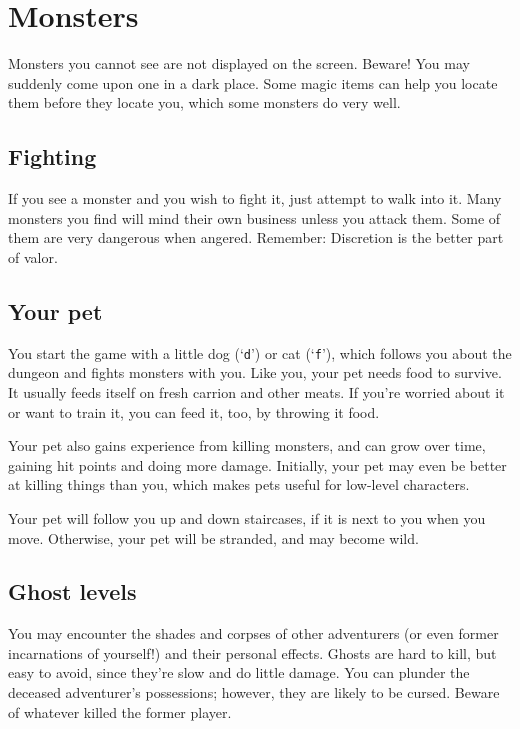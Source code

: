 \section{Monsters}

Monsters you cannot see are not displayed on the screen.  Beware!
You may suddenly come upon one in a dark place.  Some magic items can
help you locate them before they locate you, which some monsters do
very well.

\subsection*{Fighting}

If you see a monster and you wish to fight it, just attempt to walk
into it.  Many monsters you find will mind their own business unless
you attack them.  Some of them are very dangerous when angered.
Remember:  Discretion is the better part of valor.

\subsection*{Your pet}

You start the game with a little dog (`{\tt d}') or cat (`{\tt f}'),
which follows
you about the dungeon and fights monsters with you.  Like you, your
pet needs food to survive.  It usually feeds itself on fresh carrion
and other meats.  If you're worried about it or want to train it, you
can feed it, too, by throwing it food.

Your pet also gains experience from killing monsters, and can grow
over time, gaining hit points and doing more damage.  Initially, your
pet may even be better at killing things than you, which makes pets
useful for low-level characters.

Your pet will follow you up and down staircases, if it is next to you
when you move.  Otherwise, your pet will be stranded, and may become
wild.

\subsection*{Ghost levels}

You may encounter the shades and corpses of other adventurers (or even
former incarnations of yourself!) and their personal effects.  Ghosts
are hard to kill, but easy to avoid, since they're slow and do little
damage.  You can plunder the deceased adventurer's possessions;
however, they are likely to be cursed.  Beware of whatever killed the
former player.

